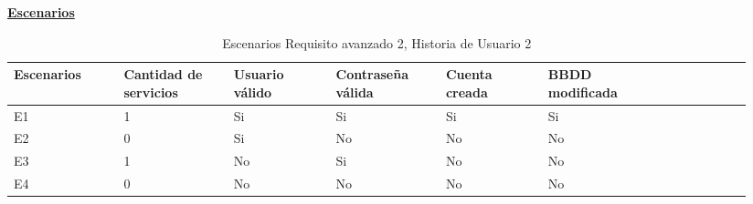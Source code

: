 \documentclass[../ei103948-project-documentation.tex]{subfiles}
\begin{document}
							\begin{center}
								\textbf{\underline{Escenarios}}
								\begin{table}[H]
									\centering
									\begin{tabular}{|p{0.14\linewidth}|p{0.14\linewidth}|p{0.13\linewidth}|p{0.14\linewidth}|p{0.13\linewidth}|p{0.14\linewidth}|p{0.12\linewidth}|}
										\hline
										\textbf{Escenarios} & \textbf{Cantidad de servicios} & \textbf{Usuario válido} & \textbf{Contraseña válida} & \textbf{Cuenta creada} & \textbf{BBDD modificada} \\ \hline
										E1                  & 1                              & Si                      & Si                         & Si                     & Si                       \\ \hline
										E2                  & 0                              & Si                      & No                         & No                     & No                       \\ \hline
										E3                  & 1                              & No                      & Si                         & No                     & No                       \\ \hline
										E4                  & 0                              & No                      & No                         & No                     & No                       \\ \hline
										\end{tabular}
									\caption{Escenarios Requisito avanzado 2, Historia de Usuario 2}
								\end{table}

								\descripcionAvanzadaG


\end{center}
\end{document}
